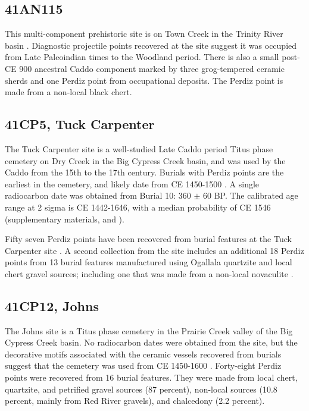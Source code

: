 \documentclass[review]{elsarticle}
\begin{document}
\subsection*{41AN115}

This multi-component prehistoric site is on Town Creek in the Trinity River basin \citep{RN8982}. Diagnostic projectile points recovered at the site suggest it was occupied from Late Paleoindian times to the Woodland period. There is also a small post-CE 900 ancestral Caddo component marked by three grog-tempered ceramic sherds and one Perdiz point from occupational deposits. The Perdiz point is made from a non-local black chert.

\subsection*{41CP5, Tuck Carpenter}

The Tuck Carpenter site is a well-studied Late Caddo period Titus phase cemetery on Dry Creek in the Big Cypress Creek basin, and was used by the Caddo from the 15th to the 17th century. Burials with Perdiz points are the earliest in the cemetery, and likely date from CE 1450-1500 \citep[197]{RN8962}. A single radiocarbon date was obtained from Burial 10: 360 $\pm$ 60 BP. The calibrated age range at 2 sigma is CE 1442-1646, with a median probability of CE 1546 (supplementary materials, and \citet{RN8980}).

Fifty seven Perdiz points have been recovered from burial features at the Tuck Carpenter site \citep{RN8963,RN3158,RN3159}. A second collection from the site includes an additional 18 Perdiz points from 13 burial features manufactured using Ogallala quartzite and local chert gravel sources; including one that was made from a non-local novaculite \citep[Table 2]{RN8962}.

\subsection*{41CP12, Johns}

The Johns site is a Titus phase cemetery in the Prairie Creek valley of the Big Cypress Creek basin. No radiocarbon dates were obtained from the site, but the decorative motifs associated with the ceramic vessels recovered from burials suggest that the cemetery was used from CE 1450-1600 \citep{RN2440}. Forty-eight Perdiz points were recovered from 16 burial features. They were made from local chert, quartzite, and petrified gravel sources (87 percent), non-local sources (10.8 percent, mainly from Red River gravels), and chalcedony (2.2 percent).
\end{document}
